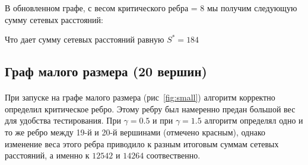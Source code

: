 \documentclass[12pt]{article}
\begin{document}
В обновленном графе, с весом критического ребра = 8 мы получим следующую
сумму сетевых расстояний:

Что дает сумму сетевых расстояний равную $S^* = 184$

\subsection{Граф малого размера (20 вершин)}

\paragraph{}
При запуске на графе малого размера (рис~\ref{fig:small}) 
алгоритм корректно определил критическое ребро.
Этому ребру был намеренно предан большой вес для удобства тестирования.
При $\gamma = 0.5$ и при $\gamma = 1.5$ алгоритм определял одно
и то же ребро между 19-й и 20-й вершинами (отмечено красным),
однако изменение веса этого ребра приводило к разным итоговым
суммам сетевых расстояний, а именно к $12542$ и $14264$ соотвественно.
\end{document}
